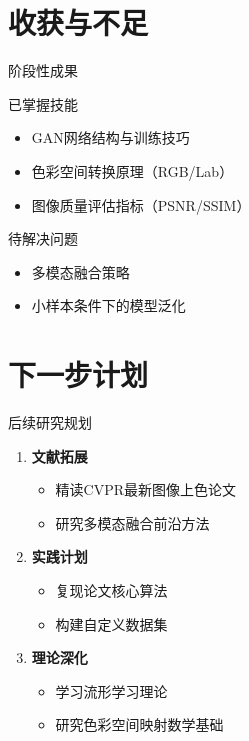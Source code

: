 \documentclass[aspectratio=169,AutoFakeBold]{beamer}
\begin{document}
\section{收获与不足}
\begin{frame}{阶段性成果}
    \begin{textbox}{已掌握技能}
        \begin{itemize}
            \item GAN网络结构与训练技巧
            \item 色彩空间转换原理（RGB/Lab）
            \item 图像质量评估指标（PSNR/SSIM）
        \end{itemize}
    \end{textbox}
    
    \begin{textbox}{待解决问题}
        \begin{itemize}
            \item 多模态融合策略
            \item 小样本条件下的模型泛化
        \end{itemize} 
    \end{textbox}
\end{frame}

\section{下一步计划}
\begin{frame}{后续研究规划}
    \begin{enumerate}
        \item \textbf{文献拓展}
            \begin{itemize}
                \item 精读CVPR最新图像上色论文
                \item 研究多模态融合前沿方法
            \end{itemize}
        \item \textbf{实践计划}
            \begin{itemize}
                \item 复现论文核心算法
                \item 构建自定义数据集
            \end{itemize}
        \item \textbf{理论深化}
            \begin{itemize}
                \item 学习流形学习理论
                \item 研究色彩空间映射数学基础
            \end{itemize}
    \end{enumerate}
\end{frame}
\end{document}
